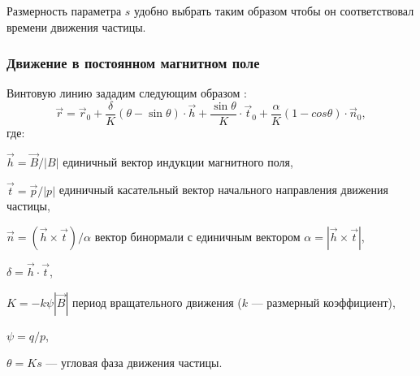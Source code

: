 Размерность параметра $s$ удобно выбрать таким образом чтобы он соответствовал
времени движения частицы.

\subsubsection{Движение в постоянном магнитном поле}

Винтовую линию зададим следующим образом \cite{StrandlieJacobians}:
\begin{equation}
    \vec{r} = \vec{r}_0 + \frac{\delta}{K} (\theta - \sin \theta ) \cdot \vec{h} + \frac{\sin \theta}{K} \cdot \vec{t}_0 + \frac{\alpha}{K} (1 - cos \theta) \cdot \vec{n}_0,
    \label{eq:helixMovement}
\end{equation}
где:
\begin{description}
    \item $\vec{h} = \vec{B}/|B|$ единичный вектор индукции магнитного поля,
    \item $\vec{t} = \vec{p}/|p|$ единичный касательный вектор начального 
    направления движения частицы,
    \item $\vec{n} = (\vec{h} \times \vec{t})/\alpha$ вектор бинормали с
    единичным вектором $\alpha = |\vec{h} \times \vec{t}|$,
    \item $\delta = \vec{h} \cdot \vec{t}$,
    \item $K = -k \psi |\vec{B}|$ период вращательного движения ($k$ ---
    размерный коэффициент),
    \item $\psi = q/p$,
    \item $\theta = K s$ --- угловая фаза движения частицы.
\end{description}

